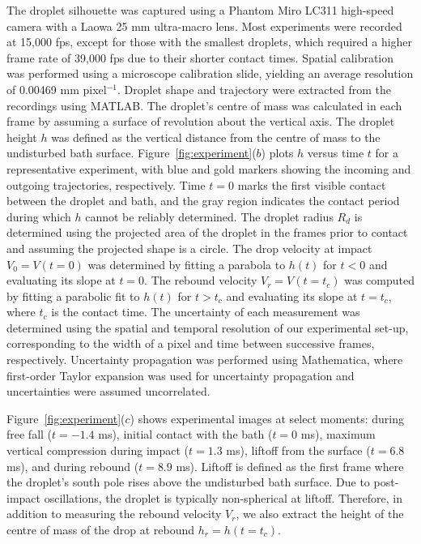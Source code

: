 \documentclass{jfm}
\begin{document}
The droplet silhouette was captured using a Phantom Miro LC311 high-speed camera with a Laowa 25 mm ultra-macro lens. Most experiments were recorded at 15,000 fps, except for those with the smallest droplets, which required a higher frame rate of 39,000 fps due to their shorter contact times. Spatial calibration was performed using a microscope calibration slide, yielding an average resolution of 0.00469 mm pixel$^{-1}$. Droplet shape and trajectory were extracted from the recordings using MATLAB. The droplet's centre of mass was calculated in each frame by assuming a surface of revolution about the vertical axis. The droplet height $h$ was defined as the vertical distance from the centre of mass to the undisturbed bath surface. Figure~\ref{fig:experiment}($b$) plots $h$ versus time $t$ for a representative experiment, with blue and gold markers showing the incoming and outgoing trajectories, respectively. Time $t=0$ marks the first visible contact between the droplet and bath, and the gray region indicates the contact period during which $h$ cannot be reliably determined. The droplet radius $R_{d}$ is determined using the projected area of the droplet in the frames prior to contact and assuming the projected shape is a circle. The drop velocity at impact $V_{0} = V\left(t=0\right)$ was determined by fitting a parabola to  $h\left(t\right)$ for $t<0$ and evaluating its slope at $t=0$. The rebound velocity $V_{r}=V\left(t=t_{c}\right)$ was computed by fitting a parabolic fit to $h\left(t\right)$ for $t>t_{c}$ and evaluating its slope at $t=t_{c}$, where $t_{c}$ is the contact time. The uncertainty of each measurement was determined using the spatial and temporal resolution of our experimental set-up, corresponding to the width of a pixel and time between successive frames, respectively. Uncertainty propagation was performed using Mathematica, where first-order Taylor expansion was used for uncertainty propagation and uncertainties were assumed uncorrelated.

Figure~\ref{fig:experiment}($c$) shows experimental images at select moments: during free fall ($t=-1.4$ ms), initial contact with the bath ($t=0$ ms), maximum vertical compression during impact ($t=1.3$ ms), liftoff from the surface ($t=6.8$ ms), and during rebound ($t=8.9$ ms). Liftoff is defined as the first frame where the droplet’s south pole rises above the undisturbed bath surface. Due to post-impact oscillations, the droplet is typically non-spherical at liftoff. Therefore, in addition to measuring the rebound velocity $V_{r}$, we also extract the height of the centre of mass of the drop at rebound $h_{r}=h\left(t=t_{c}\right)$. 
\end{document}
